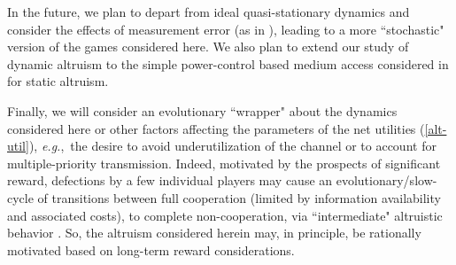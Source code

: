 \documentclass[12pt,onecolumn,draftcls]{IEEEtran}
\newcommand{\eg}{{\em e.g.},~}
\begin{document}
In the future, we plan to depart from ideal quasi-stationary dynamics and
consider the effects of measurement error (as in \cite{Cui08,Menache07}),
leading to a more ``stochastic" version of the games considered here.  We
also plan to extend our study of dynamic altruism to the simple
power-control based medium access considered in \cite{Kesidis10-cdc} for
static altruism.  


Finally, we will consider an evolutionary ``wrapper" about the dynamics
considered here or other factors affecting the parameters  of the net
utilities (\ref{alt-util}), \eg the desire to avoid underutilization of the
channel or to account for multiple-priority transmission.  Indeed,
motivated by the prospects of significant reward, defections  by  a few
individual players may cause an evolutionary/slow-cycle of transitions
between full cooperation (limited by information availability and
associated costs), to complete non-cooperation,
via ``intermediate" altruistic behavior \cite{Nowak06}.
So, the altruism considered herein may, in principle, be  rationally
motivated based on long-term reward considerations.
\end{document}
